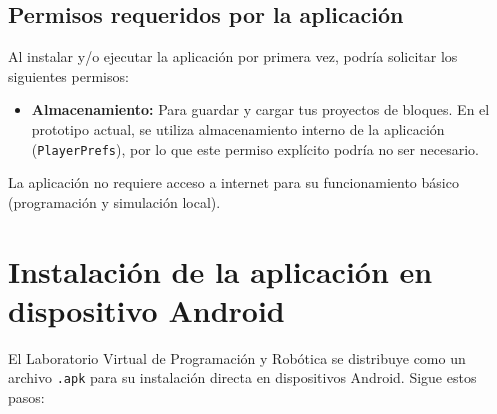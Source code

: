 \subsection{Permisos requeridos por la aplicación}
Al instalar y/o ejecutar la aplicación por primera vez, podría solicitar los siguientes permisos:
\begin{itemize}
	\item \textbf{Almacenamiento:} Para guardar y cargar tus proyectos de bloques. En el prototipo actual, se utiliza almacenamiento interno de la aplicación (\texttt{PlayerPrefs}), por lo que este permiso explícito podría no ser necesario.

\end{itemize}
La aplicación no requiere acceso a internet para su funcionamiento básico (programación y simulación local).

\section{Instalación de la aplicación en dispositivo Android}
El Laboratorio Virtual de Programación y Robótica se distribuye como un archivo \texttt{.apk} para su instalación directa en dispositivos Android. Sigue estos pasos:

